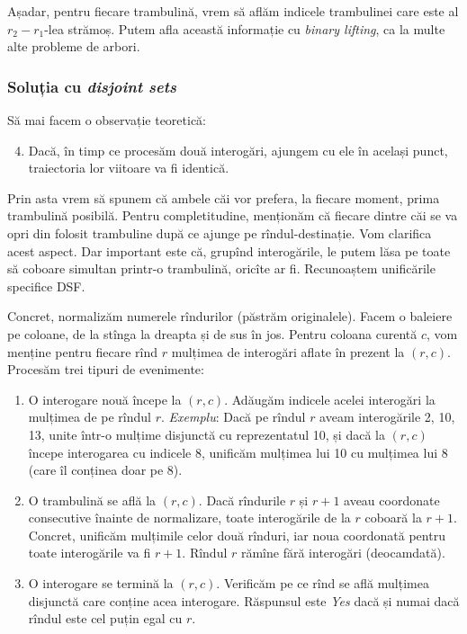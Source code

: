\documentclass[../main.tex]{subfiles}
\begin{document}
Așadar, pentru fiecare trambulină, vrem să aflăm indicele trambulinei care este al $r_2 - r_1$-lea strămoș. Putem afla această informație cu \textit{binary lifting}, ca la multe alte probleme de arbori.

\subsubsection*{Soluția cu \textit{disjoint sets}}

Să mai facem o observație teoretică:

\begin{enumerate}
  \setcounter{enumi}{3}
  \item Dacă, în timp ce procesăm două interogări, ajungem cu ele în același punct, traiectoria lor viitoare va fi identică.
\end{enumerate}

Prin asta vrem să spunem că ambele căi vor prefera, la fiecare moment, prima trambulină posibilă. Pentru completitudine, menționăm că fiecare dintre căi se va opri din folosit trambuline după ce ajunge pe rîndul-destinație. Vom clarifica acest aspect. Dar important este că, grupînd interogările, le putem lăsa pe toate să coboare simultan printr-o trambulină, oricîte ar fi. Recunoaștem unificările specifice DSF.

Concret, normalizăm numerele rîndurilor (păstrăm originalele). Facem o baleiere pe coloane, de la stînga la dreapta și de sus în jos. Pentru coloana curentă $c$, vom menține pentru fiecare rînd $r$ mulțimea de interogări aflate în prezent la $(r,c)$. Procesăm trei tipuri de evenimente:

\begin{enumerate}
  \item O interogare nouă începe la $(r,c)$. Adăugăm indicele acelei interogări la mulțimea de pe rîndul $r$. \textit{Exemplu}: Dacă pe rîndul $r$ aveam interogările 2, 10, 13, unite într-o mulțime disjunctă cu reprezentatul 10, și dacă la $(r,c)$ începe interogarea cu indicele 8, unificăm mulțimea lui 10 cu mulțimea lui 8 (care îl conținea doar pe 8).

  \item O trambulină se află la $(r,c)$. Dacă rîndurile $r$ și $r+1$ aveau coordonate consecutive înainte de normalizare, toate interogările de la $r$ coboară la $r+1$. Concret, unificăm mulțimile celor două rînduri, iar noua coordonată pentru toate interogările va fi $r+1$. Rîndul $r$ rămîne fără interogări (deocamdată).

  \item O interogare se termină la $(r,c)$. Verificăm pe ce rînd se află mulțimea disjunctă care conține acea interogare. Răspunsul este \textit{Yes} dacă și numai dacă rîndul este cel puțin egal cu $r$.
\end{enumerate}
\end{document}
